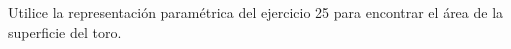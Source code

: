 \item Utilice la representación paramétrica del ejercicio 25 para encontrar el área de la superficie del toro.
